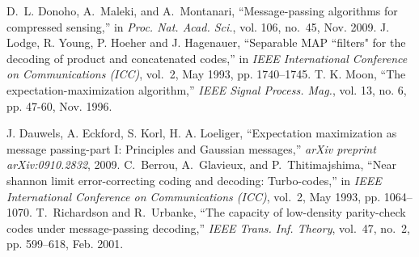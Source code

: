 \documentclass[journal]{IEEEtran}
\begin{document}
 

 
 

\begin{thebibliography}{1}
D.~L. Donoho, A.~Maleki, and A.~Montanari, ``Message-passing algorithms for compressed sensing,''  in \textit{Proc. Nat. Acad. Sci.}, vol. 106, no.~45, Nov. 2009. 
J. Lodge, R. Young, P. Hoeher and J. Hagenauer, ``Separable MAP ``filters" for the decoding of product and concatenated codes,'' in \textit{IEEE International Conference on Communications (ICC)}, vol.~2, May 1993, pp. 1740--1745.
T. K. Moon, ``The expectation-maximization algorithm,'' \textit{IEEE Signal Process. Mag.}, vol. 13, no. 6, pp. 47-60, Nov. 1996.

J. Dauwels, A. Eckford, S. Korl, H. A. Loeliger, ``Expectation maximization as message passing-part I: Principles and Gaussian messages,'' \textit{arXiv preprint arXiv:0910.2832}, 2009. 
C.~Berrou, A.~Glavieux, and P.~Thitimajshima, ``Near shannon limit
  error-correcting coding and decoding: Turbo-codes,'' in \textit{IEEE
  International Conference on Communications (ICC)}, vol.~2, May 1993, pp.
  1064--1070.
T.~Richardson and R.~Urbanke, ``The capacity of low-density parity-check codes
  under message-passing decoding,'' \textit{{IEEE} Trans. Inf. Theory}, vol.~47,
  no.~2, pp. 599--618, Feb. 2001.


\end{thebibliography}
\end{document}
